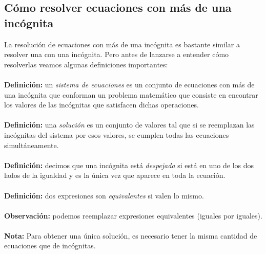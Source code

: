 \documentclass{article}
\begin{document}
\subsection{Cómo resolver ecuaciones con más de una incógnita}
\begin{normalsize}
La resolución de ecuaciones con más de una incógnita es bastante similar a resolver una con una incógnita.
Pero antes de lanzarse a entender cómo resolverlas veamos algunas definiciones importantes:\\\\
\textbf{Definición:} un \textit{sistema de ecuaciones} es un conjunto de ecuaciones con más de una incógnita que conforman un problema matemático que consiste en encontrar los valores de las incógnitas que satisfacen dichas operaciones.\\\\
\textbf{Definición:} una \textit{solución} es un conjunto de valores tal que si se reemplazan las incógnitas del sistema por esos valores, se cumplen todas las ecuaciones simultáneamente.\\\\
\textbf{Definición:} decimos que una incógnita está \textit{despejada} si está en uno de los dos lados de la igualdad y es la única vez que aparece en toda la ecuación.\\\\
\textbf{Definición:} dos expresiones son \textit{equivalentes} si valen lo mismo.\\\\
\textbf{Observación:} podemos reemplazar expresiones equivalentes (iguales por iguales).\\\\
\textbf{Nota:} Para obtener una única solución, es necesario tener la misma cantidad de ecuaciones que de incógnitas.
\\\\
\end{normalsize}
\end{document}
